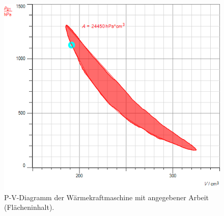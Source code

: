 \documentclass[12pt,a4paper,twopage]{article}
\begin{document}
\begin{center}
\begin{figure}[H]
\includegraphics[scale=0.7]{bachgraf/heissluft.png}
\caption{P-V-Diagramm der Wärmekraftmaschine mit angegebener Arbeit (Flächeninhalt).}
\label{fig:heissluft-pv}
\end{figure}
\end{center}
\end{document}
